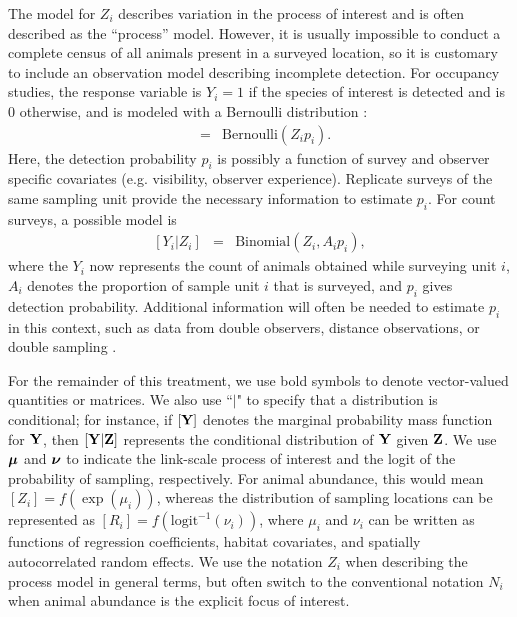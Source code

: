 \documentclass[times,mee,doublespace,]{besauth2}
\begin{document}
The model for $Z_i$ describes variation in the process of interest and is often described as the ``process'' model.  However, it is usually impossible to conduct a complete census of all animals present in a surveyed location, so it is customary to include an observation model describing incomplete detection.  For occupancy studies, the response variable is $Y_i = 1$ if the species of interest is detected and is 0 otherwise, and is modeled with a Bernoulli distribution \citep{Royle2008}:
\begin{eqnarray}
  [Y_i|Z_i] & = & \text{Bernoulli}(Z_i p_i).
\end{eqnarray}
 Here, the detection probability $p_i$ is possibly a function of survey and observer specific covariates (e.g. visibility, observer experience). Replicate surveys of the same sampling unit provide the necessary information to estimate $p_i$.   For count surveys, a possible model is
\begin{eqnarray}
  \label{eq:obs_binomial}
  [Y_i|Z_i] & = & \text{Binomial}(Z_i, A_i p_i),
\end{eqnarray}
where the $Y_i$ now represents the count of animals obtained while surveying unit $i$, $A_i$ denotes the proportion of sample unit $i$ that is surveyed, and $p_i$ gives detection probability.  Additional information will often be needed to estimate $p_i$ in this context, such as data from double observers, distance observations, or double sampling \citep[see e.g.][]{BucklandEtAl2001,Royle2004,Borchers2006,ConnEtAl2014}.

For the remainder of this treatment, we use bold symbols to denote vector-valued quantities or matrices.  We also use ``$|$" to specify that a distribution is conditional; for instance, if $[{\bf Y}]$ denotes the marginal probability mass function for ${\bf Y}$, then  $[{\bf Y}|{\bf Z}]$ represents the conditional distribution of ${\bf Y}$ given ${\bf Z}$.  We use $\boldsymbol{\mu}$ and $\boldsymbol{\nu}$ to indicate the link-scale process of interest and the logit of the probability of sampling, respectively.  For animal abundance, this would mean $[Z_i] = f(\exp(\mu_i))$, whereas the distribution of sampling locations can be represented as $[R_i] = f(\text{logit}^{-1}(\nu_i))$, where $\mu_i$ and $\nu_i$ can be written as functions of regression coefficients, habitat covariates, and spatially autocorrelated random effects.  We use the notation $Z_i$ when describing the process model in general terms, but often switch to the conventional notation $N_i$ when animal abundance is the explicit focus of interest.
\end{document}
